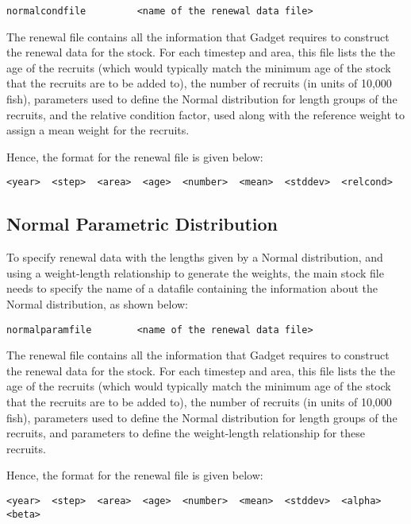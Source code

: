 \documentclass[]{book}
\begin{document}
\begin{verbatim}
normalcondfile         <name of the renewal data file>
\end{verbatim}

The renewal file contains all the information that Gadget requires to
construct the renewal data for the stock. For each timestep and area,
this file lists the the age of the recruits (which would typically match
the minimum age of the stock that the recruits are to be added to), the
number of recruits (in units of 10,000 fish), parameters used to define
the Normal distribution for length groups of the recruits, and the
relative condition factor, used along with the reference weight to
assign a mean weight for the recruits.

Hence, the format for the renewal file is given below:

\begin{verbatim}
<year>  <step>  <area>  <age>  <number>  <mean>  <stddev>  <relcond>
\end{verbatim}

\hypertarget{normal-parametric-distribution-1}{%
\subsection{Normal Parametric Distribution}\label{normal-parametric-distribution-1}}

To specify renewal data with the lengths given by a Normal distribution,
and using a weight-length relationship to generate the weights, the main
stock file needs to specify the name of a datafile containing the
information about the Normal distribution, as shown below:

\begin{verbatim}
normalparamfile        <name of the renewal data file>
\end{verbatim}

The renewal file contains all the information that Gadget requires to
construct the renewal data for the stock. For each timestep and area,
this file lists the the age of the recruits (which would typically match
the minimum age of the stock that the recruits are to be added to), the
number of recruits (in units of 10,000 fish), parameters used to define
the Normal distribution for length groups of the recruits, and
parameters to define the weight-length relationship for these recruits.

Hence, the format for the renewal file is given below:

\begin{verbatim}
<year>  <step>  <area>  <age>  <number>  <mean>  <stddev>  <alpha>  <beta>
\end{verbatim}
\end{document}
